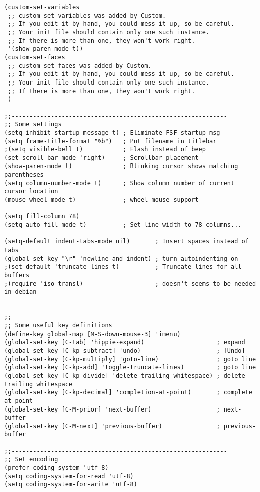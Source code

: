 \documentclass[
  12pt,
  spanish,
]{article}
\begin{document}
\begin{verbatim}
(custom-set-variables
 ;; custom-set-variables was added by Custom.
 ;; If you edit it by hand, you could mess it up, so be careful.
 ;; Your init file should contain only one such instance.
 ;; If there is more than one, they won't work right.
 '(show-paren-mode t))
(custom-set-faces
 ;; custom-set-faces was added by Custom.
 ;; If you edit it by hand, you could mess it up, so be careful.
 ;; Your init file should contain only one such instance.
 ;; If there is more than one, they won't work right.
 )

;;------------------------------------------------------------
;; Some settings
(setq inhibit-startup-message t) ; Eliminate FSF startup msg
(setq frame-title-format "%b")   ; Put filename in titlebar
;(setq visible-bell t)           ; Flash instead of beep
(set-scroll-bar-mode 'right)     ; Scrollbar placement
(show-paren-mode t)              ; Blinking cursor shows matching parentheses
(setq column-number-mode t)      ; Show column number of current cursor location
(mouse-wheel-mode t)             ; wheel-mouse support

(setq fill-column 78)
(setq auto-fill-mode t)          ; Set line width to 78 columns...

(setq-default indent-tabs-mode nil)       ; Insert spaces instead of tabs
(global-set-key "\r" 'newline-and-indent) ; turn autoindenting on
;(set-default 'truncate-lines t)          ; Truncate lines for all buffers
;(require 'iso-transl)                    ; doesn't seems to be needed in debian


;;------------------------------------------------------------
;; Some useful key definitions
(define-key global-map [M-S-down-mouse-3] 'imenu)
(global-set-key [C-tab] 'hippie-expand)                    ; expand
(global-set-key [C-kp-subtract] 'undo)                     ; [Undo]
(global-set-key [C-kp-multiply] 'goto-line)                ; goto line
(global-set-key [C-kp-add] 'toggle-truncate-lines)         ; goto line
(global-set-key [C-kp-divide] 'delete-trailing-whitespace) ; delete trailing whitespace
(global-set-key [C-kp-decimal] 'completion-at-point)       ; complete at point
(global-set-key [C-M-prior] 'next-buffer)                  ; next-buffer
(global-set-key [C-M-next] 'previous-buffer)               ; previous-buffer

;;------------------------------------------------------------
;; Set encoding
(prefer-coding-system 'utf-8)
(setq coding-system-for-read 'utf-8)
(setq coding-system-for-write 'utf-8)


\end{verbatim}
\end{document}

